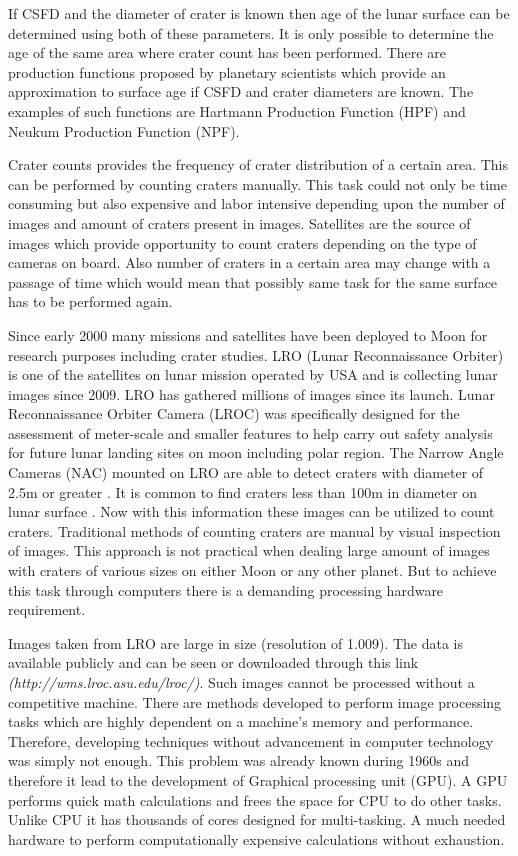 \documentclass[11pt]{article}
\begin{document}
If CSFD and the diameter of crater is known then age of the lunar surface can be determined using both of these parameters. It is only possible to determine the age of the same area where crater count has been performed. There are production functions proposed by planetary scientists which provide an approximation to surface age if CSFD and crater diameters are known. The examples of such functions are Hartmann Production Function (HPF) and Neukum Production Function (NPF).

Crater counts provides the frequency of crater distribution of a certain area. This can be performed by counting craters manually. This task could not only be time consuming but also expensive and labor intensive depending upon the number of images and amount of craters present in images. Satellites are the source of images which provide opportunity to count craters depending on the type of cameras on board. Also number of craters in a certain area may change with a passage of time which would mean that possibly same task for the same surface has to be performed again.

Since early 2000 many missions and satellites have been deployed to Moon for research purposes including crater studies. LRO (Lunar Reconnaissance Orbiter) is one of the satellites on lunar mission operated by USA and is collecting lunar images since 2009. LRO has gathered millions of images since its launch. Lunar Reconnaissance Orbiter Camera (LROC) was specifically designed for the assessment of meter-scale and smaller features to help carry out safety analysis for future lunar landing sites on moon including polar region. The Narrow Angle Cameras (NAC) mounted on LRO are able to detect craters with diameter of 2.5m or greater \cite{robinson2010lunar}. It is common to find craters less than 100m in diameter on lunar surface \cite{robinson2010lunar}. Now with this information these images can be utilized to count craters. Traditional methods of counting craters are manual by visual inspection of images. This approach is not practical when dealing large amount of images with craters of various sizes on either Moon or any other planet. But to achieve this task through computers there is a demanding processing hardware requirement.

Images taken from LRO are large in size (resolution of 1.009). The data is available publicly and can be seen or downloaded through this link \textit{(http://wms.lroc.asu.edu/lroc/)}. 
Such images cannot be processed without a competitive machine. There are methods developed to perform image processing tasks which are highly dependent on a machine's memory and performance. Therefore, developing techniques without advancement in computer technology was simply not enough. This problem was already known during 1960s and therefore it lead to the development of Graphical processing unit (GPU). A GPU performs quick math calculations and frees the space for CPU to do other tasks. Unlike CPU it has thousands of cores designed for multi-tasking. A much needed hardware to perform computationally expensive calculations without exhaustion. 
\end{document}
